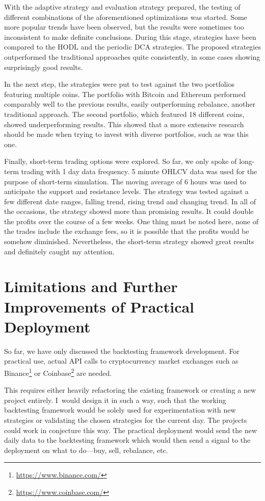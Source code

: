 With the adaptive strategy and evaluation strategy prepared, the testing of different combinations of the aforementioned optimizations was started. Some more popular trends have been observed, but the results were sometimes too inconsistent to make definite conclusions. During this stage, strategies have been compared to the HODL and the periodic DCA strategies. The proposed strategies outperformed the traditional approaches quite consistently, in some cases showing surprisingly good results.

In the next step, the strategies were put to test against the two portfolios featuring multiple coins. The portfolio with Bitcoin and Ethereum performed comparably well to the previous results, easily outperforming rebalance, another traditional approach. The second portfolio, which featured 18 different coins, showed underperforming results. This showed that a more extensive research should be made when trying to invest with diverse portfolios, such as was this one.

Finally, short-term trading options were explored. So far, we only spoke of long-term trading with 1 day data frequency. 5 minute OHLCV data was used for the purpose of short-term simulation. The moving average of 6 hours was used to anticipate the support and resistance levels. The strategy was tested against a few different date ranges, falling trend, rising trend and changing trend. In all of the occasions, the strategy showed more than promising results. It could double the profits over the course of a few weeks. One thing must be noted here, none of the trades include the exchange fees, so it is possible that the profits would be somehow diminished. Nevertheless, the short-term strategy showed great results and definitely caught my attention.

\chapter{Limitations and Further Improvements of Practical Deployment}
\label{chapter-limitations-and-improvements}

So far, we have only discussed the backtesting framework development. For practical use, actual API calls to cryptocurrency market exchanges such as Binance\footnote{\url{https://www.binance.com/}} or Coinbase\footnote{\url{https://www.coinbase.com/}} are needed.

This requires either heavily refactoring the existing framework or creating a new project entirely. I~would design it in such a way, such that the working backtesting framework would be solely used for experimentation with new strategies or validating the chosen strategies for the current day. The projects could work in conjecture this way. The practical deployment would send the new daily data to the backtesting framework which would then send a signal to the deployment on what to do---buy, sell, rebalance, etc.

